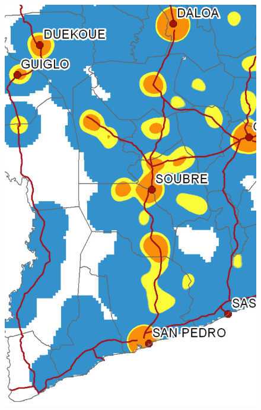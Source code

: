 \begin{figure}
{    \includegraphics[scale = 0.15]{results/images/kernel/l_hour7_kd_detail.pdf}
	\label{fig:subfig2_detail}
}
\subfigure[Monday, 08:00]{
}
\end{figure}

